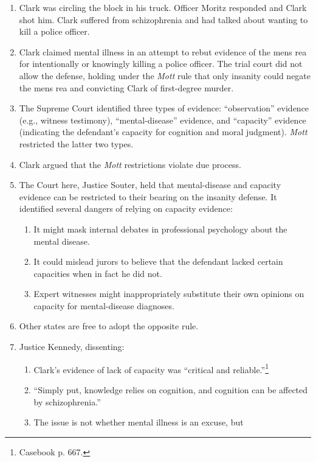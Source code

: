 \begin{enumerate}
    \item Clark was circling the block in his truck. Officer Moritz responded 
    and Clark shot him. Clark suffered from schizophrenia and had talked about 
    wanting to kill a police officer.
    \item Clark claimed mental illness in an attempt to rebut evidence of the 
    mens rea for intentionally or knowingly killing a police officer. The 
    trial court did not allow the defense, holding under the \emph{Mott} rule 
    that only insanity could negate the mens rea and convicting Clark of 
    first-degree murder.
    \item The Supreme Court identified three types of evidence: 
    ``observation'' evidence (e.g., witness testimony), ``mental-disease'' 
    evidence, and ``capacity'' evidence (indicating the defendant's capacity 
    for cognition and moral judgment). \emph{Mott} restricted the latter two 
    types.
    \item Clark argued that the \emph{Mott} restrictions violate due process.
    \item The Court here, Justice Souter, held that mental-disease and 
    capacity evidence can be restricted to their bearing on the insanity 
    defense. It identified several dangers of relying on capacity evidence:
    \begin{enumerate}
        \item It might mask internal debates in professional psychology about 
        the mental disease.
        \item It could mislead jurors to believe that the defendant lacked 
        certain capacities when in fact he did not.
        \item Expert witnesses might inappropriately substitute their own 
        opinions on capacity for mental-disease diagnoses.
    \end{enumerate}
    \item Other states are free to adopt the opposite rule.
    \item Justice Kennedy, dissenting:
    \begin{enumerate}
        \item Clark's evidence of lack of capacity was ``critical and 
        reliable.''\footnote{Casebook p. 667.}
        \item ``Simply put, knowledge relies on cognition, and cognition can 
        be affected by schizophrenia.''
        \item The issue is not whether mental illness is an excuse, but 

\end{enumerate}
\end{enumerate}
